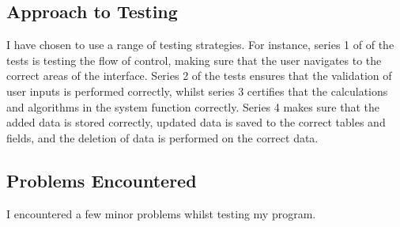 \subsection{Approach to Testing}

I have chosen to use a range of testing strategies. For instance, series 1 of of the tests is testing the flow of control, making sure that the user navigates to the correct areas of the interface. Series 2 of the tests ensures that the validation of user inputs is performed correctly, whilst series 3 certifies that the calculations and algorithms in the system function correctly. Series 4 makes sure that the added data is stored correctly, updated data is saved to the correct tables and fields, and the deletion of data is performed on the correct data. 

\subsection{Problems Encountered}

I encountered a few minor problems whilst testing my program.

